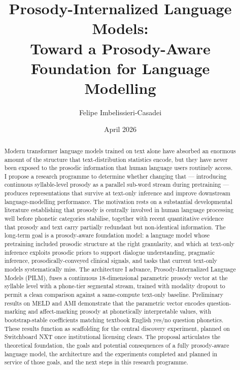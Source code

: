 \documentclass[11pt,letterpaper]{article}
\title{\vspace{-0.4in}\textbf{Prosody-Internalized Language Models:\\
Toward a Prosody-Aware Foundation for Language Modelling}}
\author[1]{Felipe Imbelissieri-Casadei}
\affil[1]{Department of Linguistics, University of Washington \\ \texttt{faic@uw.edu}}
\date{April 2026}
\begin{document}
\maketitle

\vspace{-0.3in}

\begin{abstract}
\noindent
Modern transformer language models trained on text alone have absorbed an enormous amount of the structure that text-distribution statistics encode, but they have never been exposed to the prosodic information that human language users routinely access. I propose a research programme to determine whether changing that --- introducing continuous syllable-level prosody as a parallel sub-word stream during pretraining --- produces representations that survive at text-only inference and improve downstream language-modelling performance. The motivation rests on a substantial developmental literature establishing that prosody is centrally involved in human language processing well before phonetic categories stabilise, together with recent quantitative evidence that prosody and text carry partially redundant but non-identical information. The long-term goal is a prosody-aware foundation model: a language model whose pretraining included prosodic structure at the right granularity, and which at text-only inference exploits prosodic priors to support dialogue understanding, pragmatic inference, prosodically-conveyed clinical signals, and tasks that current text-only models systematically miss. The architecture I advance, Prosody-Internalized Language Models (PILM), fuses a continuous 18-dimensional parametric prosody vector at the syllable level with a phone-tier segmental stream, trained with modality dropout to permit a clean comparison against a same-compute text-only baseline. Preliminary results on MELD and AMI demonstrate that the parametric vector encodes question-marking and affect-marking prosody at phonetically interpretable values, with bootstrap-stable coefficients matching textbook English yes/no question phonetics. These results function as scaffolding for the central discovery experiment, planned on Switchboard NXT once institutional licensing clears. The proposal articulates the theoretical foundation, the goals and potential consequences of a fully prosody-aware language model, the architecture and the experiments completed and planned in service of those goals, and the next steps in this research programme.
\end{abstract}
\end{document}
